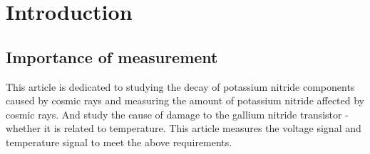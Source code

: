 \chapter{Introduction}
\label{chap:Introduction}
 
\section{Importance of measurement}
\label{Importance of measurement}
This article is dedicated to studying the decay of potassium nitride components caused by cosmic rays and measuring the amount of potassium nitride affected by cosmic rays. And study the cause of damage to the gallium nitride transistor - whether it is related to temperature. This article measures the voltage signal and temperature signal to meet the above requirements.


